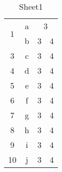 \documentclass{article}
\begin{document}
\begin{table}[H]
	\centering
	\begin{tabular}{|c|c|c|c|}
	\hline
	\multirow{2}{*}{1}	&	a	&		\multicolumn{2}{|c|}{3}	\\
	\cline{2-4}
	&	b	&	3	&	4	\\
	\hline
	3	&	c	&	3	&	4	\\
	\hline
	4	&	d	&	3	&	4	\\
	\hline
	5	&	e	&	3	&	4	\\
	\hline
	6	&	f	&	3	&	4	\\
	\hline
	7	&	g	&	3	&	4	\\
	\hline
	8	&	h	&	3	&	4	\\
	\hline
	9	&	i	&	3	&	4	\\
	\hline
	10	&	j	&	3	&	4	\\
	\hline
	\end{tabular}
	\caption{Sheet1}
\end{table}
\end{document}
